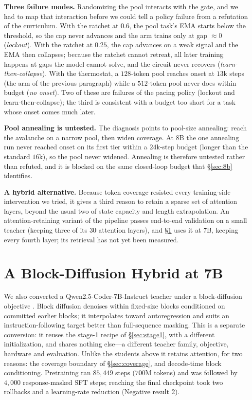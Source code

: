 \documentclass{article}
\begin{document}
\textbf{Three failure modes.} Randomizing the pool interacts with the gate, and we had to map that interaction before we could tell a policy failure from a refutation of the curriculum. With the ratchet at $0.6$, the pool task's EMA starts below the threshold, so the cap never advances and the arm trains only at gap ${\approx}0$ (\emph{lockout}). With the ratchet at $0.25$, the cap advances on a weak signal and the EMA then collapses; because the ratchet cannot retreat, all later training happens at gaps the model cannot solve, and the circuit never recovers (\emph{learn-then-collapse}). With the thermostat, a $128$-token pool reaches onset at $13$k steps (the arm of the previous paragraph) while a $512$-token pool never does within budget (\emph{no onset}). Two of these are failures of the pacing policy (lockout and learn-then-collapse); the third is consistent with a budget too short for a task whose onset comes much later.

\textbf{Pool annealing is untested.} The diagnosis points to pool-size annealing: reach the avalanche on a narrow pool, then widen coverage. At $8$B the one annealing run never reached onset on its first tier within a $24$k-step budget (longer than the standard $16$k), so the pool never widened. Annealing is therefore untested rather than refuted, and it is blocked on the same closed-loop budget that \S\ref{sec:8b} identifies.

\textbf{A hybrid alternative.} Because token coverage resisted every training-side intervention we tried, it gives a third reason to retain a sparse set of attention layers, beyond the usual two of state capacity and length extrapolation. An attention-retaining variant of the pipeline passes end-to-end validation on a small teacher (keeping three of its 30 attention layers), and \S\ref{sec:blockdiff} uses it at $7$B, keeping every fourth layer; its retrieval has not yet been measured.

\section{A Block-Diffusion Hybrid at 7B}\label{sec:blockdiff}

We also converted a Qwen2.5-Coder-7B-Instruct teacher \citep{hui2024qwen25coder} under a block-diffusion objective \citep{arriola2025bd3lm}. Block diffusion denoises within fixed-size blocks conditioned on committed earlier blocks; it interpolates toward autoregression and suits an instruction-following target better than full-sequence masking. This is a separate conversion: it reuses the stage-1 recipe of \S\ref{sec:stage1}, with a different initialization, and shares nothing else---a different teacher family, objective, hardware and evaluation. Unlike the students above it retains attention, for two reasons: the coverage boundary of \S\ref{sec:coverage}, and decode-time block conditioning. Pretraining ran $85{,}449$ steps ($700$M tokens) and was followed by $4{,}000$ response-masked SFT steps; reaching the final checkpoint took two rollbacks and a learning-rate reduction (Negative result 2).
\end{document}
